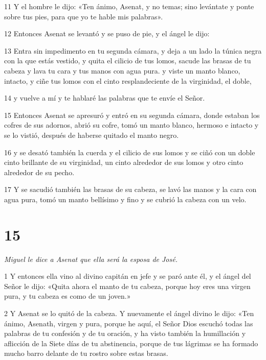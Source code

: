 \par 11 Y el hombre le dijo: «Ten ánimo, Asenat, y no temas; sino levántate y ponte sobre tus pies, para que yo te hable mis palabras».

\par 12 Entonces Asenat se levantó y se puso de pie, y el ángel le dijo:

\par 13 Entra sin impedimento en tu segunda cámara, y deja a un lado la túnica negra con la que estás vestido, y quita el cilicio de tus lomos, sacude las brasas de tu cabeza y lava tu cara y tus manos con agua pura. y viste un manto blanco, intacto, y ciñe tus lomos con el cinto resplandeciente de la virginidad, el doble,

\par 14 y vuelve a mí y te hablaré las palabras que te envíe el Señor.

\par 15 Entonces Asenat se apresuró y entró en su segunda cámara, donde estaban los cofres de sus adornos, abrió su cofre, tomó un manto blanco, hermoso e intacto y se lo vistió, después de haberse quitado el manto negro.

\par 16 y se desató también la cuerda y el cilicio de sus lomos y se ciñó con un doble cinto brillante de su virginidad, un cinto alrededor de sus lomos y otro cinto alrededor de su pecho.

\par 17 Y se sacudió también las brasas de su cabeza, se lavó las manos y la cara con agua pura, tomó un manto bellísimo y fino y se cubrió la cabeza con un velo.

\chapter{15}

\par \textit{Miguel le dice a Asenat que ella será la esposa de José.}

\par 1 Y entonces ella vino al divino capitán en jefe y se paró ante él, y el ángel del Señor le dijo: «Quita ahora el manto de tu cabeza, porque hoy eres una virgen pura, y tu cabeza es como de un joven.»

\par 2 Y Asenat se lo quitó de la cabeza. Y nuevamente el ángel divino le dijo: «Ten ánimo, Asenath, virgen y pura, porque he aquí, el Señor Dios escuchó todas las palabras de tu confesión y de tu oración, y ha visto también la humillación y aflicción de la Siete días de tu abstinencia, porque de tus lágrimas se ha formado mucho barro delante de tu rostro sobre estas brasas.

